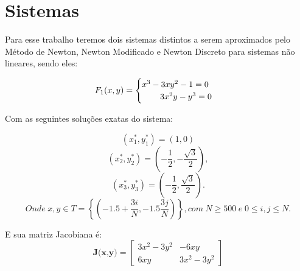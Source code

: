 \section{Sistemas}
Para esse trabalho teremos dois sistemas distintos a serem aproximados pelo Método de Newton, Newton Modificado e Newton Discreto para sistemas não lineares, sendo eles:

\begin{equation}
    F_{1}(x,y) =
  \begin{cases}
    x^3 - 3xy^2 - 1 = 0 \\
    \hspace{7.5mm}3x^2y - y^3 = 0
  \end{cases}
\end{equation}

Com as seguintes soluções exatas do sistema:

$$
    (x^*_{1},y^*_{1}) = (1,0) 
$$
$$
    (x^*_{2},y^*_{2}) = (-\frac{1}{2},-\frac{\sqrt3}{2}), 
$$
$$
    (x^*_{3},y^*_{3}) = (-\frac{1}{2},\frac{\sqrt3}{2}). 
$$
$$
   Onde \hspace{3pt} x,y \in T = \left\{ \left( -1.5 +\frac{3i}{N},-1.5 \frac{3j}{N} \right) \right\}, com \hspace{3pt} N \ge 500 \hspace{3pt} e \hspace{3pt} 0 \le i,j \le N.
$$

E sua matriz Jacobiana é: 
$$\textbf{J(x,y)}=\begin{bmatrix}
3x^2 - 3y^2 & -6xy \\
6xy & 3x^2 - 3y^2
\end{bmatrix}$$
\vspace{10pt}


